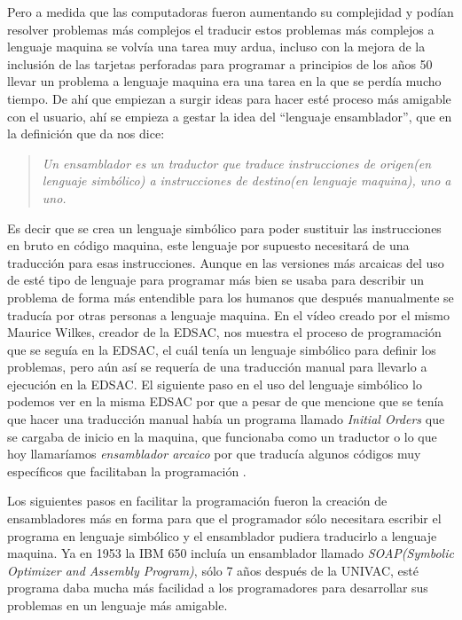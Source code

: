 \documentclass[letterpaper,12pt,oneside]{book}
\begin{document}
		Pero a medida que las computadoras fueron aumentando su complejidad y podían resolver problemas más complejos el traducir estos problemas más complejos
		a lenguaje maquina se volvía una tarea muy ardua, incluso con la mejora de la inclusión de las tarjetas perforadas para programar a principios de los
		años 50 llevar un problema a lenguaje maquina era una tarea en la que se perdía mucho tiempo. De ahí que empiezan a surgir ideas para hacer esté proceso
		más amigable con el usuario, ahí se empieza a gestar la idea del ``lenguaje ensamblador'', que en la definición que da \cite{salomon_assemblers_1992} nos
		dice:
		
		\begin{quote}
			\emph{Un ensamblador es un traductor que traduce instrucciones de origen(en lenguaje simbólico) a instrucciones de destino(en lenguaje maquina), uno a uno.}
		\end{quote}
		
		Es decir que se crea un lenguaje simbólico para poder sustituir las instrucciones en bruto en código maquina, este lenguaje por supuesto necesitará
		de una traducción para esas instrucciones. Aunque en las versiones más arcaicas del uso de esté tipo de lenguaje para programar más bien se usaba
		para describir un problema de forma más entendible para los humanos que después manualmente se traducía por otras personas a lenguaje maquina.
		En el vídeo \cite{maurice_vincent_wilkes_edsac_1976} creado por el mismo Maurice Wilkes, creador de la EDSAC, nos muestra el proceso de programación que se
		seguía en la EDSAC, el cuál tenía un lenguaje simbólico para definir los problemas, pero aún así se requería de una traducción manual para llevarlo
		a ejecución en la EDSAC. El siguiente paso en el uso del lenguaje simbólico lo podemos ver en la misma EDSAC por que a pesar de que mencione
		que se tenía que hacer una traducción manual había un programa llamado \textit{Initial Orders} que se cargaba de inicio en la maquina, que funcionaba como
		un traductor o lo que hoy llamaríamos \textit{ensamblador arcaico} por que traducía algunos códigos muy específicos que facilitaban la programación
		\cite{salomon_assemblers_1992,richards_edsac_nodate}.
		
		Los siguientes pasos en facilitar la programación fueron la creación de ensambladores más en forma para que el programador sólo necesitara
		escribir el programa en lenguaje simbólico y el ensamblador pudiera traducirlo a lenguaje maquina. Ya en 1953 la IBM 650 incluía un ensamblador
		llamado \textit{SOAP(Symbolic Optimizer and Assembly Program)}, sólo 7 años después de la UNIVAC, esté programa daba mucha más facilidad a los programadores
		para desarrollar sus problemas en un lenguaje más amigable\cite{salomon_assemblers_1992}.
		
\end{document}
